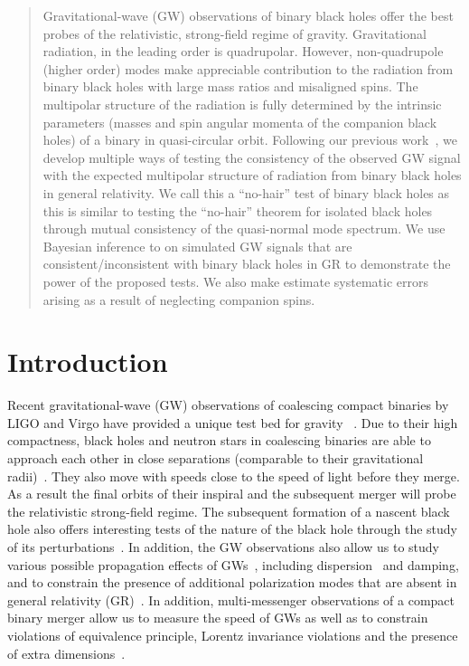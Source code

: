 \documentclass[prd,preprintnumbers,twocolumn,eqsecnum,floatfix,a4paper,nofootinbib,superscriptaddress]{revtex4}
\begin{document}
\begin{abstract}
Gravitational-wave (GW) observations of binary black holes offer the best probes of the relativistic, strong-field regime of gravity. Gravitational radiation, in the leading order is quadrupolar. However, non-quadrupole (higher order) modes make appreciable contribution to the radiation from binary black holes with large mass ratios and misaligned spins. The multipolar structure of the radiation is fully determined by the intrinsic parameters (masses and spin angular momenta of the companion black holes) of a binary in quasi-circular orbit. Following our previous work~\cite{Dhanpal:2018ufk}, we develop multiple ways of testing the consistency of the observed GW signal with the expected multipolar structure of radiation from binary black holes in general relativity. We call this a ``no-hair'' test of binary black holes as this is similar to testing the ``no-hair'' theorem for isolated black holes through mutual consistency of the quasi-normal mode spectrum. We use Bayesian inference to on simulated GW signals that are consistent/inconsistent with binary black holes in GR to demonstrate the power of the proposed tests. We also make estimate systematic errors arising as a result of neglecting companion spins. 
\end{abstract}
\preprint{}
\maketitle
\section{Introduction}

Recent gravitational-wave (GW) observations of coalescing compact binaries by LIGO and Virgo have provided a unique test bed for gravity ~\cite{LSC_2016grtests,gw170104,ligo2019tests,abbott2019tests,abbott2017gravitational}. Due to their high compactness, black holes and neutron stars in coalescing binaries are able to approach each other in close separations (comparable to their gravitational radii)~\cite{GW150914}. They also move with speeds close to the speed of light before they merge. As a result the final orbits of their inspiral and the subsequent merger will probe the relativistic strong-field regime. The subsequent formation of a nascent black hole also offers interesting tests of the nature of the black hole through the study of its perturbations~\cite{Berti:2009kk}. In addition, the GW observations also allow us to study various possible propagation effects of GWs~\cite{samajdar2017projected}, including dispersion~\cite{Will:1997bb} and damping, and to constrain the presence of additional polarization modes that are absent in general relativity (GR)~\cite{isi2017probing}. In addition, multi-messenger observations of a compact binary merger allow us to measure the speed of GWs as well as to constrain violations of equivalence principle, Lorentz invariance violations and the presence of extra dimensions~\cite{abbott2019tests,abbott2017gravitational,Pardo:2018ipy}.
\end{document}
